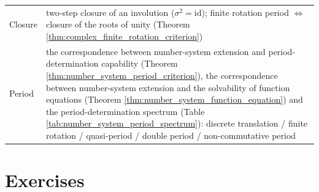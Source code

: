 \begin{longtable}{>{\raggedright\arraybackslash}p{3cm}>{\raggedright\arraybackslash}p{10.5cm}}
Closure & two-step closure of an involution ($\sigma^2=\mathrm{id}$); finite rotation period $\Leftrightarrow$ closure of the roots of unity (Theorem \ref{thm:complex_finite_rotation_criterion}) \\
Period & the correspondence between number-system extension and period-determination capability (Theorem \ref{thm:number_system_period_criterion}), the correspondence between number-system extension and the solvability of function equations (Theorem \ref{thm:number_system_function_equation}) and the period-determination spectrum (Table \ref{tab:number_system_period_spectrum}): discrete translation / finite rotation / quasi-period / double period / non-commutative period \\
\bottomrule
\end{longtable}
\endgroup

\section*{Exercises}

